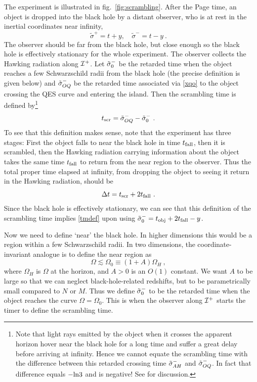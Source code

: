\documentclass[12pt,oneside,letterpaper]{article}
\newcommand{\be}{\begin{equation}}
\newcommand{\ee}{\end{equation}}
\def\be{\begin{eqnarray}}
\def\ee{\end{eqnarray}}
\def\be{\begin{equation}}
\def\ee{\end{equation}}
\def\m{{M}}
\def\log{{\rm ln}}
\numberwithin{equation}{section}
\def \be {\begin{equation}}
\def \ee {\end{equation}}
\begin{document}
The experiment is illustrated in fig.~\ref{fig:scrambling}. After the Page time, an object is dropped into the black hole by a distant observer, who is at rest in the inertial coordinates near infinity,
\be
\tilde{\sigma}^+ = t + y , \quad \tilde{\sigma}^- = t - y \ .
\ee
The observer should be far from the black hole, but close enough so the black hole is effectively stationary for the whole experiment.
The observer collects the Hawking radiation along ${\cal I}^+$. Let $\tilde{\sigma}^-_0$ be the retarded time when the object reaches a few Schwarzschild radii from the black hole (the precise definition is given below) and $\tilde{\sigma}_{OQ}^-$ be the retarded time associated via 
\eqref{xqo} to the object crossing the QES curve and entering  the  island. Then the scrambling time is defined by\footnote{Note that light rays emitted by the object when it crosses the apparent horizon hover near the black hole for a long time and suffer a great delay before arriving at infinity. Hence we cannot equate the scrambling time with the difference between this retarded crossing time $\tilde{\sigma}_{AH}^-$ and $\tilde{\sigma}_{OQ}^-$. In fact that difference equals $-\log 3$ and is negative! See \cite{Penington:2019npb,Almheiri:2019psf,Almheiri:2019hni,Almheiri:2019yqk} for discussion.}
\be\label{tmdef}
t_{\rm scr} = \tilde{\sigma}^-_{OQ} - \tsigma^-_0 \ .
\ee
To see that this definition makes sense, note that the experiment has three stages: First the object falls to near the black hole in time $t_{\rm fall}$, then it is scrambled, then the Hawking radiation carrying information about the object takes the same time $t_{\rm fall}$ to return from the near region to the observer. Thus the total proper time elapsed at infinity, from dropping the object to seeing it return in the Hawking radiation, should be 
\be
\Delta t = t_{\rm scr} + 2 t_{\rm fall} \ .
\ee
Since the black hole is effectively stationary, we can see that this definition of the scrambling time implies \eqref{tmdef} upon using $\tilde{\sigma}^-_0 = t_{\rm obj}+2t_{\rm fall} - y$. 

Now we need to define `near' the black hole.   In higher dimensions this would be a region within a few Schwarzschild radii. In two dimensions, the coordinate-invariant analogue is to define the near region as
\be
\Omega \lesssim \Omega_0 \equiv (1+A) \Omega_H \ ,
\ee
where $\Omega_H$ is $\Omega$ at the horizon, and $A > 0$ is an $O(1)$ constant. We want $A$ to be large so that we can neglect black-hole-related redshifts, but to be parametrically small compared to $N$ or $\m$. Thus we define $\tilde{\sigma}^-_0$ to be the retarded time when the object reaches the curve $\Omega = \Omega_0$. This is when the observer along ${\cal I}^+$ starts the timer to define the scrambling time.
\end{document}

